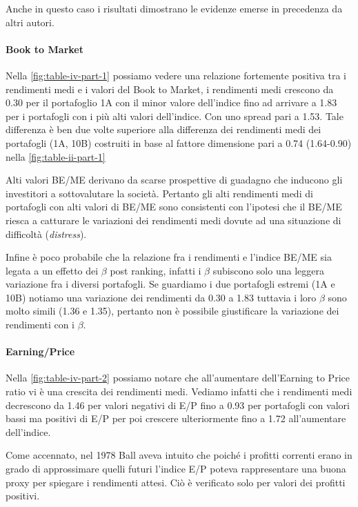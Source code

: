Anche in questo caso i risultati dimostrano le evidenze emerse in precedenza da altri autori. 

\paragraph{Book to Market}
Nella \ref{fig:table-iv-part-1} possiamo vedere una relazione fortemente positiva tra i rendimenti medi e i valori del Book to Market, i rendimenti medi crescono da 0.30 per il portafoglio 1A con il minor valore dell'indice fino ad arrivare a 1.83 per i portafogli con i più alti valori dell'indice. Con uno spread pari a 1.53. Tale differenza è ben due volte superiore alla differenza dei rendimenti medi dei portafogli (1A, 10B) costruiti in base al fattore dimensione pari a 0.74 (1.64-0.90) nella \ref{fig:table-ii-part-1}


Alti valori BE/ME derivano da scarse prospettive di guadagno che inducono gli investitori a sottovalutare la società. Pertanto gli alti rendimenti medi di portafogli con alti valori di BE/ME sono consistenti con l'ipotesi che il BE/ME riesca a catturare le variazioni dei rendimenti medi dovute ad una situazione di difficoltà (\textit{distress}). 

Infine è poco probabile che la relazione fra i rendimenti e l'indice BE/ME sia legata a un effetto dei $\beta$ post ranking, infatti i $\beta$ subiscono solo una leggera variazione fra i diversi portafogli. Se guardiamo i due portafogli estremi (1A e 10B) notiamo una variazione dei rendimenti da 0.30 a 1.83 tuttavia i loro $\beta$ sono molto simili (1.36 e 1.35), pertanto non è possibile giustificare la variazione dei rendimenti con i $\beta$. 

\paragraph{Earning/Price}Nella \ref{fig:table-iv-part-2} possiamo notare che all'aumentare dell'Earning to Price ratio vi è una crescita dei rendimenti medi. Vediamo infatti che i rendimenti medi decrescono da 1.46 per valori negativi di E/P fino a 0.93 per portafogli con valori bassi ma positivi di E/P per poi crescere ulteriormente fino a 1.72 all'aumentare dell'indice.

Come accennato, nel 1978 Ball aveva intuito che poiché i profitti correnti erano in grado di approssimare quelli futuri l'indice E/P poteva rappresentare una buona proxy per spiegare i rendimenti attesi. Ciò è verificato solo per valori dei profitti positivi.

